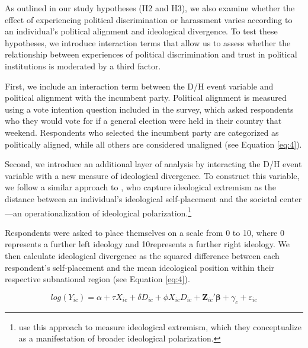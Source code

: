 \documentclass{article}
\begin{document}
As outlined in our study hypotheses (H2 and H3), we also examine whether the effect of experiencing political discrimination or harassment varies according to an individual’s political alignment and ideological divergence. To test these hypotheses, we introduce interaction terms that allow us to assess whether the relationship between experiences of political discrimination and trust in political institutions is moderated by a third factor.

First, we include an interaction term between the D/H event variable and political alignment with the incumbent party. Political alignment is measured using a vote intention question included in the survey, which asked respondents who they would vote for if a general election were held in their country that weekend. Respondents who selected the incumbent party are categorized as politically aligned, while all others are considered unaligned (see Equation \ref{eq:4}).

Second, we introduce an additional layer of analysis by interacting the D/H event variable with a new measure of ideological divergence. To construct this variable, we follow a similar approach to \textcite{torcal_ideological_2022}, who capture ideological extremism as the distance between an individual’s ideological self-placement and the societal center—an operationalization of ideological polarization.\footnote{\textcite{torcal_ideological_2022} use this approach to measure ideological extremism, which they conceptualize as a manifestation of broader ideological polarization.}

Respondents were asked to place themselves on a scale from 0 to 10, where 0 represents a further left ideology and 10represents a further right ideology. We then calculate ideological divergence as the squared difference between each respondent's self-placement and the mean ideological position within their respective subnational region (see Equation \ref{eq:4}).

\begin{equation}
  \label{eq:4}
  log(Y_{ic}) = \alpha + \tau X_{ic} + \delta D_{ic} + \phi X_{ic}D_{ic} + \mathbf{Z}_{ic}'\mathbf{\beta} + \gamma_c + \varepsilon_{ic}
  \end{equation}
  
\end{document}
